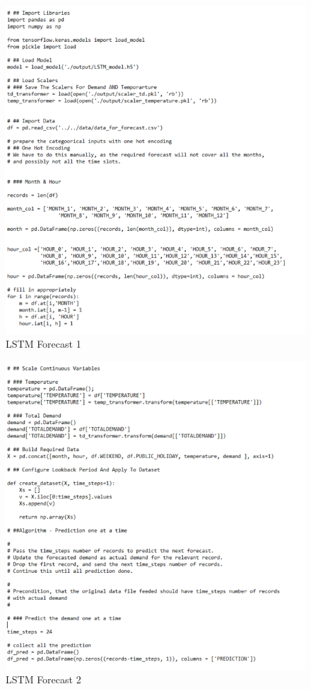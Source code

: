\documentclass[mstat,12pt]{unswthesis}
\begin{document}
\begin{figure}[H]
\includegraphics{snapshots1/new LSTM_Forecast_1.png}
\caption{LSTM Forecast 1}\label{LSTMForecast1}
\end{figure}

\begin{figure}[H]
\includegraphics{snapshots1/new LSTM_Forecast_2.png}
\caption{LSTM Forecast 2}\label{LSTMForecast2}
\end{figure}
\end{document}
